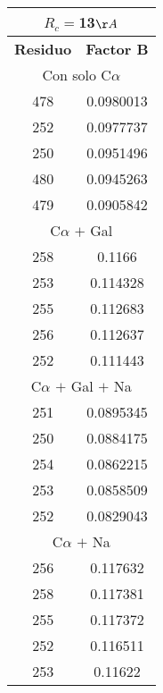 \begin{tabular}[c]{|c|c|}
\multicolumn{2}{c}{$R_c=$13$\AA$}\\\hline
\textbf{Residuo}&\textbf{Factor B}\\\hline
\multicolumn{2}{c}{Con solo C$\alpha$}\\\hline
       478& 0.0980013\\
       252& 0.0977737\\
       250& 0.0951496\\
       480& 0.0945263\\
       479& 0.0905842\\\hline
\multicolumn{2}{c}{C$\alpha$ $+$ Gal}\\\hline
       258&    0.1166\\
       253&  0.114328\\
       255&  0.112683\\
       256&  0.112637\\
       252&  0.111443\\\hline
\multicolumn{2}{c}{C$\alpha$ $+$ Gal $+$ Na}\\\hline
       251& 0.0895345\\
       250& 0.0884175\\
       254& 0.0862215\\
       253& 0.0858509\\
       252& 0.0829043\\\hline
\multicolumn{2}{c}{C$\alpha$ $+$ Na}\\\hline
       256&  0.117632\\
       258&  0.117381\\
       255&  0.117372\\
       252&  0.116511\\
       253&   0.11622\\\hline
\end{tabular}
